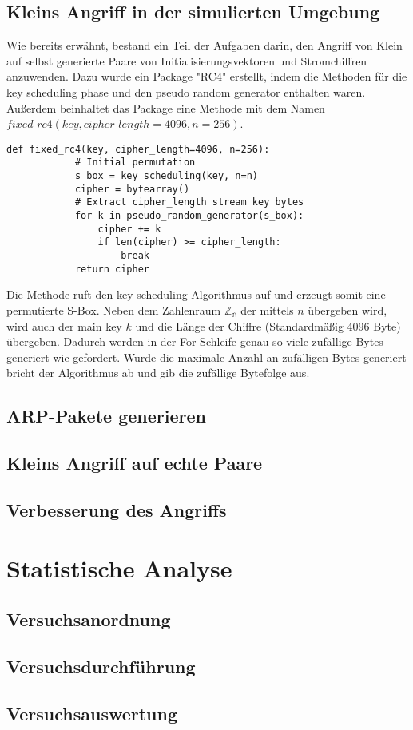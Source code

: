 \documentclass[10pt,a4paper]{article}
\begin{document}
\subsection{Kleins Angriff in der simulierten Umgebung}
Wie bereits erwähnt, bestand ein Teil der Aufgaben darin, den Angriff von Klein auf selbst generierte Paare von Initialisierungsvektoren und Stromchiffren anzuwenden. Dazu wurde ein Package "RC4" erstellt, indem die Methoden für die key scheduling phase und den pseudo random generator enthalten waren. Außerdem beinhaltet das Package eine Methode mit dem Namen $fixed\_rc4(key, cipher\_length=4096, n=256)$.
\begin{lstlisting}[backgroundcolor=\color{grey}]
		def fixed_rc4(key, cipher_length=4096, n=256):
    		# Initial permutation
    		s_box = key_scheduling(key, n=n)
    		cipher = bytearray()
    		# Extract cipher_length stream key bytes
    		for k in pseudo_random_generator(s_box):
        		cipher += k
        		if len(cipher) >= cipher_length:
            		break
    		return cipher
\end{lstlisting}
Die Methode ruft den key scheduling Algorithmus auf und erzeugt somit eine permutierte S-Box. Neben dem Zahlenraum $\mathbb{Z_n}$ der mittels $n$ übergeben wird, wird auch der main key $k$ und die Länge der Chiffre (Standardmäßig 4096 Byte) übergeben. Dadurch werden in der For-Schleife genau so viele zufällige Bytes generiert wie gefordert. Wurde die maximale Anzahl an zufälligen Bytes generiert bricht der Algorithmus ab und gib die zufällige Bytefolge aus.


\subsection{ARP-Pakete generieren}
\subsection{Kleins Angriff auf echte Paare}
\subsection{Verbesserung des Angriffs}
\section{Statistische Analyse}
\subsection{Versuchsanordnung}
\subsection{Versuchsdurchführung}
\subsection{Versuchsauswertung}
\end{document}
